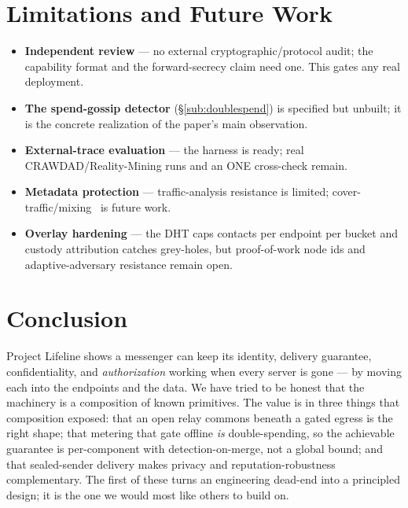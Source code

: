 \documentclass[11pt]{article}
\begin{document}
\section{Limitations and Future Work}\label{sec:future}

\begin{itemize}[leftmargin=1.6em,itemsep=1pt]
  \item \textbf{Independent review} --- no external cryptographic/protocol audit;
  the capability format and the forward-secrecy claim need one. This gates any
  real deployment.
  \item \textbf{The spend-gossip detector} (\S\ref{sub:doublespend}) is specified
  but unbuilt; it is the concrete realization of the paper's main observation.
  \item \textbf{External-trace evaluation} --- the harness is ready; real
  CRAWDAD/Reality-Mining runs and an ONE cross-check remain.
  \item \textbf{Metadata protection} --- traffic-analysis resistance is limited;
  cover-traffic/mixing~\cite{piotrowska2017loopix} is future work.
  \item \textbf{Overlay hardening} --- the DHT caps contacts per endpoint per
  bucket and custody attribution catches grey-holes, but proof-of-work node ids
  and adaptive-adversary resistance remain open.
\end{itemize}

\section{Conclusion}

Project Lifeline shows a messenger can keep its identity, delivery guarantee,
confidentiality, and \emph{authorization} working when every server is gone --- by
moving each into the endpoints and the data. We have tried to be honest that the
machinery is a composition of known primitives. The value is in three things that
composition exposed: that an open relay commons beneath a gated egress is the
right shape; that metering that gate offline \emph{is} double-spending, so the
achievable guarantee is per-component with detection-on-merge, not a global bound;
and that sealed-sender delivery makes privacy and reputation-robustness
complementary. The first of these turns an engineering dead-end into a principled
design; it is the one we would most like others to build on.

\small


\end{document}
